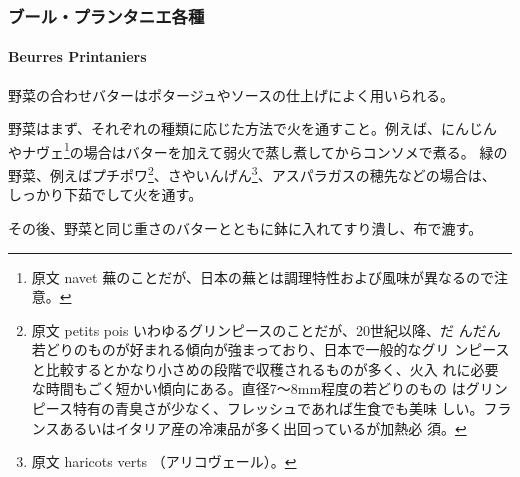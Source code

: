 \begin{recette}
\hypertarget{ux30d6ux30fcux30ebux30d7ux30e9ux30f3ux30bfux30cbux30a8ux5404ux7a2e}{%
\subsubsection{ブール・プランタニエ各種}\label{ux30d6ux30fcux30ebux30d7ux30e9ux30f3ux30bfux30cbux30a8ux5404ux7a2e}}

\hypertarget{beurres-printaniers}{%
\paragraph{Beurres Printaniers}\label{beurres-printaniers}}


野菜の合わせバターはポタージュやソースの仕上げによく用いられる。

野菜はまず、それぞれの種類に応じた方法で火を通すこと。例えば、にんじん
やナヴェ\footnote{原文 navet
  蕪のことだが、日本の蕪とは調理特性および風味が異なるので注意。}の場合はバターを加えて弱火で蒸し煮してからコンソメで煮る。
緑の野菜、例えばプチポワ\footnote{原文 petits pois
  いわゆるグリンピースのことだが、20世紀以降、だ
  んだん若どりのものが好まれる傾向が強まっており、日本で一般的なグリ
  ンピースと比較するとかなり小さめの段階で収穫されるものが多く、火入
  れに必要な時間もごく短かい傾向にある。直径7〜8mm程度の若どりのもの
  はグリンピース特有の青臭さが少なく、フレッシュであれば生食でも美味
  しい。フランスあるいはイタリア産の冷凍品が多く出回っているが加熱必
  須。}、さやいんげん\footnote{原文 haricots verts （アリコヴェール）。}、アスパラガスの穂先などの場合は、
しっかり下茹でして火を通す。

その後、野菜と同じ重さのバターとともに鉢に入れてすり潰し、布で漉す。
\end{recette}